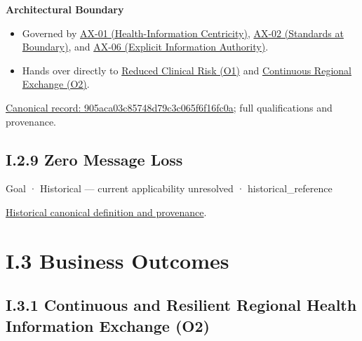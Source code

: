 \par\medskip\textbf{Architectural Boundary}\par


\begin{itemize}


\item Governed by \hyperref[element:e9bd61acaaea4577bc4086a5639e52c3]{AX-01 (Health-Information Centricity)}, \hyperref[element:eee8c3783d964d18a7f9dcea85fcd4cf]{AX-02 (Standards at Boundary)}, and \hyperref[element:952c3b6148ce4fce94b69f99a0c2fec7]{AX-06 (Explicit Information Authority)}.

\item Hands over directly to \href{\detokenize{../../../../../docs/markdown/01-motivation/goals-outcomes/business-outcomes.md}}{Reduced Clinical Risk (O1)} and \href{\detokenize{../../../../../docs/markdown/01-motivation/goals-outcomes/business-outcomes.md}}{Continuous Regional Exchange (O2)}.

\end{itemize}

{\footnotesize \href{../../../../continuum/motivation/goal/905aca03c85748d79c3c065f6f16fc0a.md}{Canonical record: 905aca03c85748d79c3c065f6f16fc0a}; full qualifications and provenance.}\par
\section*{I.2.9 Zero Message Loss}
\label{navigation:I.2.9}

\label{element:8f70dbb9c28f4dd9afe91c21243e5914}
{\small Goal · Historical — current applicability unresolved · historical\_reference}\par
\href{../../../../continuum/motivation/goal/8f70dbb9c28f4dd9afe91c21243e5914.md}{Historical canonical definition and provenance}.\par
\chapter*{I.3 Business Outcomes}
\label{navigation:I.3}

\section*{I.3.1 Continuous and Resilient Regional Health Information Exchange (O2)}
\label{navigation:I.3.1}

